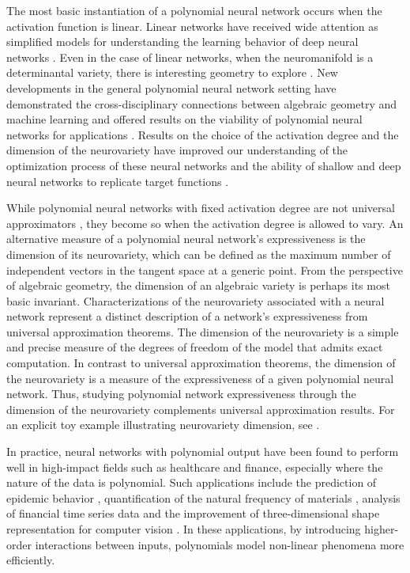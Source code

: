 \documentclass[12pt]{article}
\theoremstyle{definition}
\begin{document}
The most basic instantiation of a polynomial neural network occurs when the activation function is linear. Linear networks have received wide attention as simplified models for understanding the learning behavior of deep neural networks \cite{kawaguchi2016deeplearningpoorlocal, arora2019convergenceanalysisgradientdescent}.  Even in the case of linear networks, when the neuromanifold is a determinantal variety, there is interesting geometry to explore \cite{trager2020purespuriouscriticalpoints,kohn2024function,kohn2025geometrylinearneuralnetworks}. New developments in the general polynomial neural network setting have demonstrated the cross-disciplinary connections between algebraic geometry and machine learning and offered results on the viability of polynomial neural networks for applications \cite{KTB2019,shahverdi2024geometryoptimizationpolynomialconvolutional}. Results on the choice of the activation degree and the dimension of the neurovariety have improved our understanding of the optimization process of these neural networks and the ability of shallow and deep neural networks to replicate target functions \cite{KLW2024,Nguyen2018,arjevani2025geometryoptimizationshallowpolynomial}.

While polynomial neural networks with fixed activation degree are not universal approximators \cite{HORNIK1989359}, they become so when the activation degree is allowed to vary. An alternative measure of a polynomial neural network's expressiveness is the dimension of its neurovariety, which can be defined as the maximum number of independent vectors in the tangent space at a generic point. From the perspective of algebraic geometry,  the dimension of an algebraic variety is perhaps its most basic invariant. Characterizations of the neurovariety associated with a neural network represent a distinct description of a network's expressiveness from universal approximation theorems. The dimension of the neurovariety is a simple and precise measure of the degrees of freedom of the model that admits exact computation. 
In contrast to universal approximation theorems, the dimension of the neurovariety is a measure of the expressiveness of a given polynomial neural network. Thus, studying polynomial network expressiveness through the dimension of the neurovariety complements universal approximation results. For an explicit toy example illustrating neurovariety dimension, see \cite[Section A]{marchetti2025invitationneuroalgebraicgeometry}.

In practice, neural networks with polynomial output have been found to perform well in high-impact fields such as healthcare and finance, especially where the nature of the data is polynomial. Such applications include the prediction of epidemic behavior \cite{Fong2022}, quantification of the natural frequency of materials \cite{Dey}, analysis of financial time series data \cite{Ghazali,Nayak2018EstimatingSC} and the improvement of three-dimensional shape representation for computer vision \cite{Yavartanoo2021polynet}. 
In these applications, by introducing higher-order interactions between inputs, polynomials model non-linear phenomena more efficiently.
\end{document}
